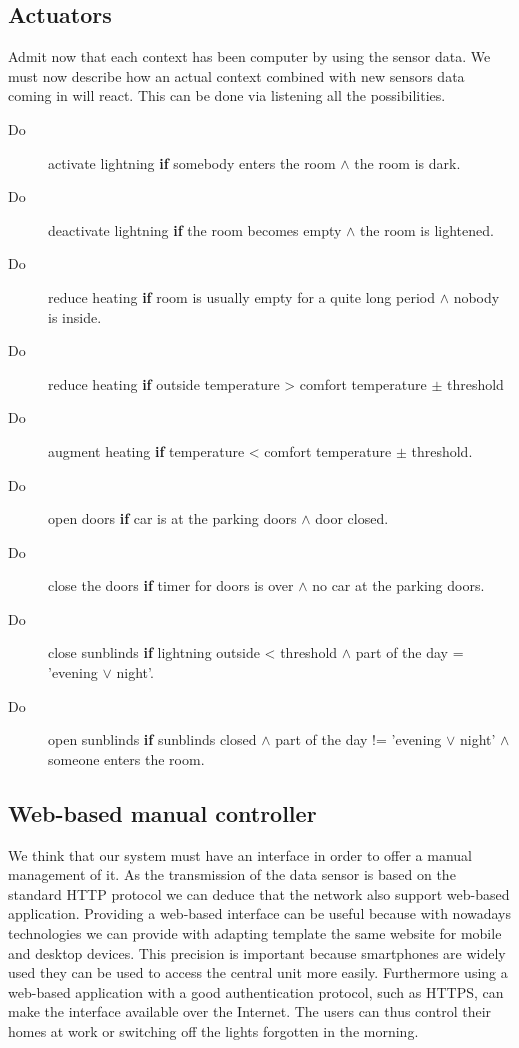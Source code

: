 \documentclass{acm_proc_article-sp}
\begin{document}
\subsection{Actuators}
Admit now that each context has been computer by using the sensor data.
We must now describe how an actual context combined with new sensors data coming in will react. 
This can be done via listening all the possibilities.
\begin{description}
 \item[Do] activate lightning \textbf{if} somebody enters the room $\land$ the room is dark.
 \item[Do] deactivate lightning \textbf{if} the room becomes empty $\land$ the room is lightened.
 \item[Do] reduce heating \textbf{if} room is usually empty for a quite long period $\land$ nobody is inside.
 \item[Do] reduce heating \textbf{if} outside temperature > comfort temperature $\pm$ threshold
 \item[Do] augment heating \textbf{if} temperature < comfort temperature $\pm$ threshold.
 \item[Do] open doors \textbf{if} car is at the parking doors $\land$ door closed.
 \item[Do] close the doors \textbf{if} timer for doors is over $\land$ no car at the parking doors.
 \item[Do] close sunblinds \textbf{if} lightning outside < threshold $\land$ part of the day = ’evening $\lor$ night’.
 \item[Do] open sunblinds \textbf{if} sunblinds closed $\land$ part of the day != ’evening $\lor$ night’ $\land$ someone enters the room.
\end{description}


\subsection{Web-based manual controller}
We think that our system must have an interface in order to offer a manual management of it.
As the transmission of the data sensor is based on the standard HTTP protocol we can deduce that the network also support web-based application.
Providing a web-based interface can be useful because with nowadays technologies we can provide with adapting template the same website for mobile and desktop devices.
This precision is important because smartphones are widely used they can be used to access the central unit more easily.
Furthermore using a web-based application with a good authentication protocol, such as HTTPS, can make the interface available over the Internet.
The users can thus control their homes at work or switching off the lights forgotten in the morning.
\end{document}
